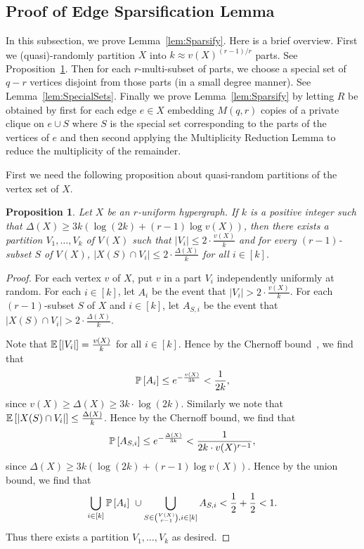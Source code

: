 \documentclass[11pt]{article}
\newcounter{i}
\theoremstyle{plain}
\newtheorem{proposition}[thm]{Proposition}
\theoremstyle{plain} %
\theoremstyle{definition}
\newcommand{\Prob}[1]{\ensuremath{%
\mathbb P\left[#1\right]
}}
\newcommand{\Expect}[1]{\ensuremath{%
\mathbb E\left[#1\right]
}}
\begin{document}
\subsection{Proof of Edge Sparsification Lemma}\label{ss:EdgeSparsification}

In this subsection, we prove Lemma~\ref{lem:Sparsify}. Here is a brief overview. First we (quasi)-randomly partition $X$ into $k\approx v(X)^{(r-1)/r}$ parts. See Proposition~\ref{prop:QuasiRandomPartition}. Then for each $r$-multi-subset of parts, we choose a special set of $q-r$ vertices disjoint from those parts (in a small degree manner). See Lemma~\ref{lem:SpecialSets}. Finally we prove Lemma~\ref{lem:Sparsify} by letting $R$ be obtained by first for each edge $e\in X$ embedding $M(q,r)$ copies of a private clique on $e\cup S$ where $S$ is the special set corresponding to the parts of the vertices of $e$ and then second applying the Multiplicity Reduction Lemma to reduce the multiplicity of the remainder.

First we need the following proposition about quasi-random partitions of the vertex set of $X$.

\begin{proposition}\label{prop:QuasiRandomPartition}
Let $X$ be an $r$-uniform hypergraph. If $k$ is a positive integer such that $\Delta(X) \ge 3k(\log (2k)+(r-1)\log v(X))$, then there exists a partition $V_1,\ldots, V_k$ of $V(X)$ such that $|V_i|\le 2\cdot \frac{v(X)}{k}$ and for every $(r-1)$-subset $S$ of $V(X)$, $|X(S)\cap V_i|\le 2\cdot \frac{\Delta(X)}{k}$ for all $i\in [k]$.
\end{proposition}
\begin{proof}
For each vertex $v$ of $X$, put $v$ in a part $V_i$ independently uniformly at random. For each $i\in[k]$, let $A_i$ be the event that $|V_i| > 2\cdot \frac{v(X)}{k}$. For each $(r-1)$-subset $S$ of $X$ and $i\in [k]$, let $A_{S,i}$ be the event that $|X(S)\cap V_i| > 2\cdot \frac{\Delta(X)}{k}$.

Note that $\Expect{|V_i|} = \frac{v(X)}{k}$ for all $i\in [k]$. Hence by the Chernoff bound~\cite{AS16}, we find that
$$\Prob{A_i} \le e^{-\frac{v(X)}{3k}} < \frac{1}{2k},$$
since $v(X) \ge \Delta(X) \ge 3k\cdot \log (2k)$. Similarly we note that $\Expect{|X(S)\cap V_i|} \le \frac{\Delta(X)}{k}$. Hence by the Chernoff bound, we find that
$$\Prob{A_{S,i}} \le e^{-\frac{\Delta(X)}{3k}} < \frac{1}{2k\cdot v(X)^{r-1}},$$
since $\Delta(X)\ge 3k(\log (2k)+(r-1)\log v(X))$.
Hence by the union bound, we find that
$$\bigcup_{i\in [k]} \Prob{A_i}~\cup \bigcup_{S\in \binom{V(X)}{r-1}, i\in [k]} A_{S,i} < \frac{1}{2} + \frac{1}{2} < 1.$$
Thus there exists a partition $V_1,\ldots, V_k$ as desired. 
\end{proof}
\end{document}
